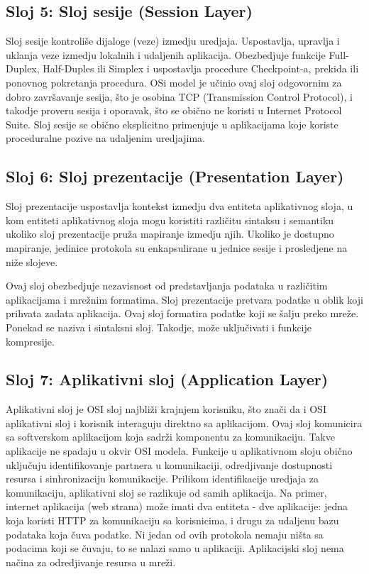 \documentclass[a4paper,12pt, master]{etf}
\begin{document}
	\subsection{Sloj 5: Sloj sesije (Session Layer)}

	Sloj sesije kontroli\v{s}e dijaloge (veze) izmedju uredjaja. Uspostavlja, upravlja i uklanja
	veze izmedju lokalnih i udaljenih aplikacija. Obezbedjuje funkcije Full-Duplex,
	Half-Duples ili	Simplex i uspostavlja procedure Checkpoint-a, prekida ili ponovnog
	pokretanja procedura. OSi model je u\v{c}inio ovaj sloj odgovornim za dobro zavr\v{s}avanje sesija,
	\v{s}to je osobina TCP (Transmission Control Protocol), i takodje proveru sesija i oporavak,
	\v{s}to se obi\v{c}no ne koristi u Internet Protocol Suite. Sloj sesije se obi\v{c}no eksplicitno
	primenjuje u aplikacijama koje koriste proceduralne pozive na udaljenim uredjajima.

	\subsection{Sloj 6: Sloj prezentacije (Presentation Layer)}

	Sloj prezentacije uspostavlja kontekst izmedju dva entiteta aplikativnog sloja, u kom
	entiteti aplikativnog sloja mogu koristiti razli\v{c}itu sintaksu i semantiku ukoliko sloj
	prezentacije pru\v{z}a mapiranje izmedju njih. Ukoliko je dostupno mapiranje, jedinice
	protokola su enkapsulirane u jednice sesije i prosledjene na ni\v{z}e slojeve.

	Ovaj sloj obezbedjuje nezavisnost od predstavljanja podataka u razli\v{c}itim aplikacijama i
	mre\v{z}nim formatima. Sloj prezentacije pretvara podatke u oblik koji prihvata zadata
	aplikacija.	Ovaj sloj formatira podatke koji se \v{s}alju preko mre\v{z}e. Ponekad se naziva i
	sintaksni sloj.	Takodje, mo\v{z}e uklju\v{c}ivati i funkcije kompresije.

	\subsection{Sloj 7: Aplikativni sloj (Application Layer)}

	Aplikativni sloj je OSI sloj najbli\v{z}i krajnjem korisniku, \v{s}to zna\v{c}i da i OSI aplikativni
	sloj i korisnik interaguju direktno sa aplikacijom. Ovaj sloj komunicira sa softverskom
	aplikacijom	koja sadr\v{z}i komponentu za komunikaciju. Takve aplikacije ne spadaju u okvir
	OSI modela.	Funkcije u aplikativnom sloju obi\v{c}no uklju\v{c}uju identifikovanje partnera u
	komunikaciji, odredjivanje dostupnosti resursa i sinhronizaciju komunikacije. Prilikom
	identifikacije uredjaja za komunikaciju, aplikativni sloj se razlikuje od samih
	aplikacija. Na primer, internet aplikacija (web strana) mo\v{z}e imati dva entiteta - dve
	aplikacije: jedna koja koristi HTTP za komunikaciju sa korisnicima, i drugu za udaljenu
	bazu podataka koja \v{c}uva podatke. Ni jedan od ovih protokola nemaju ni\v{s}ta sa podacima koji
	se \v{c}uvaju, to se nalazi samo u aplikaciji. Aplikacijski sloj nema na\v{c}ina za odredjivanje
	resursa u mre\v{z}i.
\end{document}
